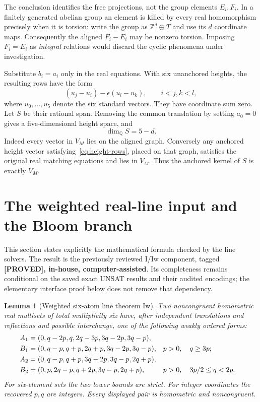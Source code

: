 \documentclass[11pt]{article}
\newtheorem{lemma}[theorem]{Lemma}
\theoremstyle{remark}
\newcommand{\Z}{\mathbb Z}
\begin{document}
The conclusion identifies the free projections, not the group elements
$E_i,F_i$. In a finitely generated abelian group an element is killed by
every real homomorphism precisely when it is torsion: write the group as
$\Z^d\oplus T$ and use its $d$ coordinate maps. Consequently the aligned
$F_i-E_i$ may be nonzero torsion. Imposing $F_i=E_i$ as \emph{integral}
relations would discard the cyclic phenomena under investigation.

Substitute $b_i=a_i$ only in the real equations. With six unanchored
heights, the resulting rows have the form
\begin{equation}\label{eq:height-rows}
 (u_j-u_i)-\epsilon(u_l-u_k),\qquad i<j, k<l,
\end{equation}
where $u_0,\ldots,u_5$ denote the six standard vectors. They have coordinate
sum zero. Let $S$ be their rational span. Removing the common translation
by setting $a_0=0$ gives a five-dimensional height space, and
\begin{equation}\label{eq:height-codimension}
 \dim_{\mathbb Q}S=5-d.
\end{equation}
Indeed every vector in $V_M$ lies on the aligned graph. Conversely any
anchored height vector satisfying~\eqref{eq:height-rows}, placed on that
graph, satisfies the original real matching equations and lies in $V_M$.
Thus the anchored kernel of $S$ is exactly $V_M$.

\section{The weighted real-line input and the Bloom branch}
\label{sec:formal-bloom}
This section states explicitly the mathematical formula checked by the
line solvers. The result is the previously reviewed I/Iw component, tagged
\textbf{[PROVED], in-house, computer-assisted}. Its completeness remains
conditional on the saved exact UNSAT results and their audited encodings;
the elementary interface proof below does not remove that dependency.

\begin{lemma}[Weighted six-atom line theorem Iw]\label{lem:iw}
Two noncongruent homometric real multisets of total multiplicity six
have, after independent translations and reflections and possible
interchange, one of the following weakly ordered forms:
\begin{align}
 A_1&=(0,q-2p,q,2q-3p,3q-2p,3q-p),\notag\\
 B_1&=(0,q-p,q+p,2q+p,3q-2p,3q-p),
       &&p>0,\quad q\ge3p;\label{eq:weighted-form-one}\\
 A_2&=(0,q-p,q+p,3q-2p,3q-p,2q+p),\notag\\
 B_2&=(0,p,2q-p,q+2p,3q-p,2q+p),
       &&p>0,\quad 3p/2\le q<2p.\label{eq:weighted-form-two}
\end{align}
For six-element sets the two lower bounds are strict. For integer
coordinates the recovered $p,q$ are integers. Every displayed pair is
homometric and noncongruent.
\end{lemma}
\end{document}
